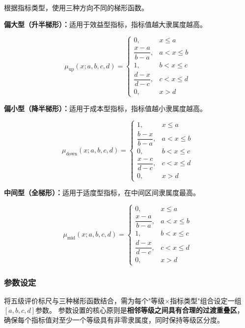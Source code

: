 \documentclass[a4paper,12pt]{ctexart}
\begin{document}
根据指标类型，使用三种方向不同的梯形函数。

\textbf{偏大型（升半梯形）：}适用于效益型指标，指标值越大隶属度越高。

\begin{equation}
\mu_{\text{up}}(x; a, b, c, d) =
\begin{cases}
0, & x \leq a \\[4pt]
\dfrac{x - a}{b - a}, & a < x \leq b \\[8pt]
1, & b < x \leq c \\[4pt]
\dfrac{d - x}{d - c}, & c < x \leq d \\[8pt]
0, & x > d
\end{cases}
\label{eq:up}
\end{equation}

\textbf{偏小型（降半梯形）：}适用于成本型指标，指标值越小隶属度越高。

\begin{equation}
\mu_{\text{down}}(x; a, b, c, d) =
\begin{cases}
1, & x \leq a \\[4pt]
\dfrac{b - x}{b - a}, & a < x \leq b \\[8pt]
0, & b < x \leq c \\[4pt]
\dfrac{x - c}{d - c}, & c < x \leq d \\[8pt]
0, & x > d
\end{cases}
\label{eq:down}
\end{equation}

\textbf{中间型（全梯形）：}适用于适度型指标，在中间区间隶属度最高。

\begin{equation}
\mu_{\text{mid}}(x; a, b, c, d) =
\begin{cases}
0, & x \leq a \\[4pt]
\dfrac{x - a}{b - a}, & a < x \leq b \\[8pt]
1, & b < x \leq c \\[4pt]
\dfrac{d - x}{d - c}, & c < x \leq d \\[8pt]
0, & x > d
\end{cases}
\label{eq:mid}
\end{equation}

\subsubsection{参数设定}

将五级评价标尺与三种梯形函数结合，需为每个"等级$\times$指标类型"组合设定一组$[a,b,c,d]$参数。
参数设置的核心原则是\textbf{相邻等级之间具有合理的过渡重叠区}，
确保每个指标值对至少一个等级具有非零隶属度，同时保持等级区分度。
\end{document}
